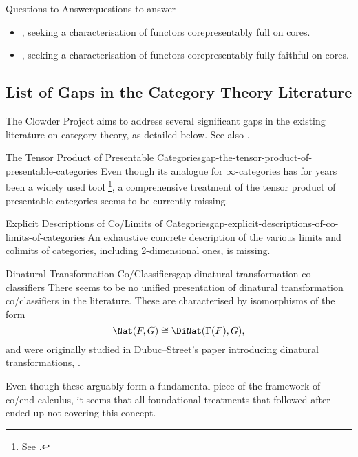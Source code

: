 \begin{remark}{Questions to Answer}{questions-to-answer}
\begin{itemize}
        \item {}, seeking a characterisation of functors corepresentably full on cores.
        \item {}, seeking a characterisation of functors corepresentably fully faithful on cores.
    \end{itemize}
\end{remark}
\subsection{List of Gaps in the Category Theory Literature}\label{subsection-list-of-gaps-in-the-category-theory-literature}
The Clowder Project aims to address several significant gaps in the existing literature on category theory, as detailed below. See also \cite{MO494959}.
\begin{gap}{The Tensor Product of Presentable Categories}{gap-the-tensor-product-of-presentable-categories}%
    Even though its analogue for $\infty$-categories has for years been a widely used tool%
    \footnote{%
        See \cite{MO490557}.
        \par\vspace*{\TCBBoxCorrection}
    }, %
    a comprehensive treatment of the tensor product of presentable categories seems to be currently missing.
\end{gap}
\begin{gap}{Explicit Descriptions of Co/Limits of Categories}{gap-explicit-descriptions-of-co-limits-of-categories}%
    An exhaustive concrete description of the various limits and colimits of categories, including 2-dimensional ones, is missing.
\end{gap}
\begin{gap}{Dinatural Transformation Co/Classifiers}{gap-dinatural-transformation-co-classifiers}%
    There seems to be no unified presentation of dinatural transformation co/classifiers in the literature. These are characterised by isomorphisms of the form
    \[
        \Nat(F,G)%
        \cong%
        \DiNat(\Gamma(F),G),%
    \]%
    and were originally studied in Dubuc--Street's paper introducing dinatural transformations, \cite{dubuc-street-dinatural-transformations}.

    \indent Even though these arguably form a fundamental piece of the framework of co/end calculus, it seems that all foundational treatments that followed after ended up not covering this concept.
\end{gap}
